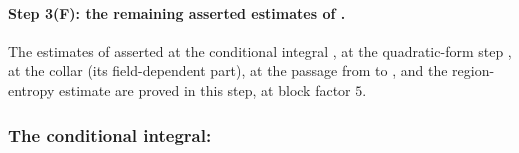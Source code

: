 
\paragraph{Step 3(F): the remaining asserted estimates of \cite{Ba2}.} The estimates of \cite[Sect.~2]{Ba2} asserted at the conditional integral \cite[p.~568]{Ba2}, at the quadratic-form step \cite[(2.108)--(2.109)]{Ba2}, at the collar \cite[Prop.~2.1, (2.57)]{Ba2} (its field-dependent part), at the passage from \cite[(3.5)]{Ba2} to \cite[(3.21)]{Ba2}, and the region-entropy estimate \cite[(3.42)]{Ba2} are proved in this step, at block factor $5$.

\subsubsection*{The conditional integral: \cite[p.~568, (2.46)--(2.47)]{Ba2}}

